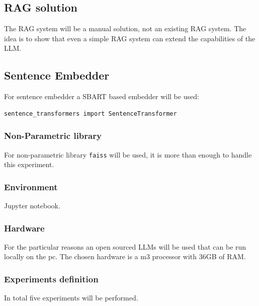 \documentclass{wseas}
\begin{document}
\subsection{RAG solution}

The RAG system will be a manual solution, not an existing RAG system.
The idea is to show that even a simple RAG system can extend the
capabilities of the LLM.

\subsection{Sentence Embedder}

For sentence embedder a SBART based embedder will be used:

\begin{verbatim}
sentence_transformers import SentenceTransformer
\end{verbatim}

\subsubsection{Non-Parametric library}

For non-parametric library \texttt{faiss} will be used, it is more than
enough to handle this experiment.

\subsubsection{Environment}

Jupyter notebook.

\subsubsection{Hardware}

For the particular reasons an open sourced LLMs will be used that can be
run locally on the pc. The chosen hardware is a m3 processor with 36GB
of RAM.

\subsubsection{Experiments definition}

In total five experiments will be performed.

\end{document}
